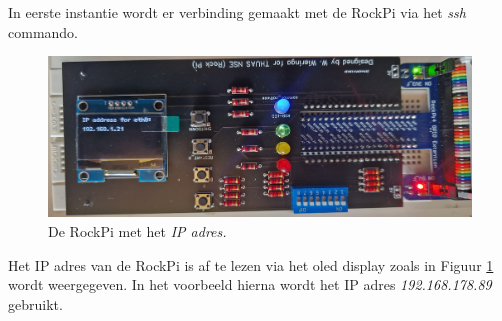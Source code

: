 In eerste instantie wordt er verbinding gemaakt met de RockPi via het \textit{ssh} commando.
\begin{figure}[h!]
	\centering
	\begin{center} 	
		\includegraphics[width=1\textwidth]{figuren/rockIPnr}
		\caption{De RockPi met het \textit{IP adres.}}
		\label{fig:rockpiip}   
	\end{center}
\end{figure}
 Het IP adres van de RockPi is af te lezen via het oled display zoals in Figuur \ref{fig:rockpiip} wordt weergegeven. In het voorbeeld hierna wordt het IP adres \textit{192.168.178.89} gebruikt.


